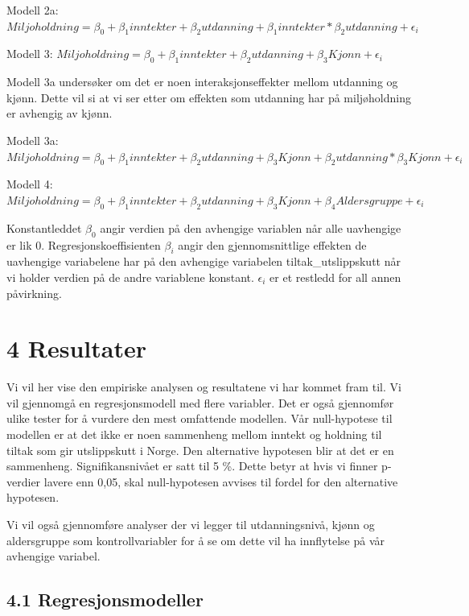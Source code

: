 \documentclass[
  12pt,
  letterpaper,
  DIV=11,
  numbers=noendperiod]{scrartcl}
\begin{document}
Modell 2a:
\(Miljoholdning=\beta_0 + \beta_1inntekter + \beta_2utdanning + \beta_1inntekter *\beta_2utdanning + \epsilon_i\ \)

Modell 3:
\(Miljoholdning=\beta_0 + \beta_1inntekter + \beta_2utdanning + \beta_3Kjonn + \epsilon_i\ \)

Modell 3a undersøker om det er noen interaksjonseffekter mellom
utdanning og kjønn. Dette vil si at vi ser etter om effekten som
utdanning har på miljøholdning er avhengig av kjønn.

Modell 3a:
\(Miljoholdning=\beta_0 + \beta_1inntekter + \beta_2utdanning + \beta_3Kjonn + \beta_2utdanning*\beta_3Kjonn + \epsilon_i\ \)

Modell 4:
\(Miljoholdning=\beta_0 + \beta_1inntekter + \beta_2utdanning + \beta_3Kjonn + \beta_4Aldersgruppe + \epsilon_i\ \)

Konstantleddet \(\beta_0\) angir verdien på den avhengige variablen når
alle uavhengige er lik 0. Regresjonskoeffisienten \(\beta_i\) angir den
gjennomsnittlige effekten de uavhengige variabelene har på den avhengige
variabelen tiltak\_utslippskutt når vi holder verdien på de andre
variablene konstant. \(\epsilon_i\) er et restledd for all annen
påvirkning.

\hypertarget{resultater}{%
\section{4 Resultater}\label{resultater}}

Vi vil her vise den empiriske analysen og resultatene vi har kommet fram
til. Vi vil gjennomgå en regresjonsmodell med flere variabler. Det er
også gjennomfør ulike tester for å vurdere den mest omfattende modellen.
Vår null-hypotese til modellen er at det ikke er noen sammenheng mellom
inntekt og holdning til tiltak som gir utslippskutt i Norge. Den
alternative hypotesen blir at det er en sammenheng. Signifikansnivået er
satt til 5 \%. Dette betyr at hvis vi finner p-verdier lavere enn 0,05,
skal null-hypotesen avvises til fordel for den alternative hypotesen.

Vi vil også gjennomføre analyser der vi legger til utdanningsnivå, kjønn
og aldersgruppe som kontrollvariabler for å se om dette vil ha
innflytelse på vår avhengige variabel.

\hypertarget{regresjonsmodeller}{%
\subsection{4.1 Regresjonsmodeller}\label{regresjonsmodeller}}
\end{document}
